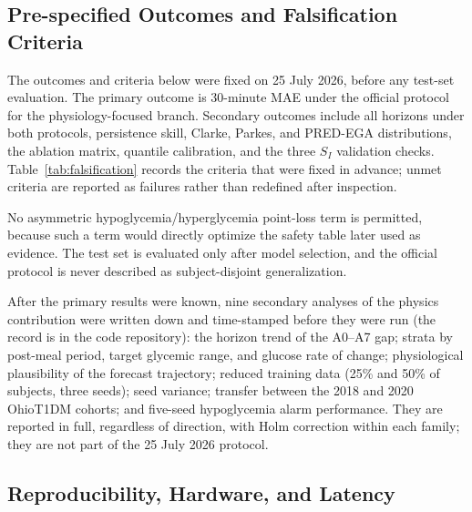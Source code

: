 \documentclass[journal]{IEEEtran}
\begin{document}
\subsection{Pre-specified Outcomes and Falsification Criteria}
\label{sec:prespec}

The outcomes and criteria below were fixed on 25 July 2026, before any test-set evaluation. The primary outcome is 30-minute MAE under the official protocol for the physiology-focused branch. Secondary outcomes include all horizons under both protocols, persistence skill, Clarke, Parkes, and PRED-EGA distributions, the ablation matrix, quantile calibration, and the three $S_I$ validation checks. Table~\ref{tab:falsification} records the criteria that were fixed in advance; unmet criteria are reported as failures rather than redefined after inspection.

No asymmetric hypoglycemia/hyperglycemia point-loss term is permitted, because such a term would directly optimize the safety table later used as evidence. The test set is evaluated only after model selection, and the official protocol is never described as subject-disjoint generalization.

After the primary results were known, nine secondary analyses of the physics contribution were written down and time-stamped before they were run (the record is in the code repository): the horizon trend of the A0--A7 gap; strata by post-meal period, target glycemic range, and glucose rate of change; physiological plausibility of the forecast trajectory; reduced training data (25\% and 50\% of subjects, three seeds); seed variance; transfer between the 2018 and 2020 OhioT1DM cohorts; and five-seed hypoglycemia alarm performance. They are reported in full, regardless of direction, with Holm correction within each family; they are not part of the 25 July 2026 protocol.

\subsection{Reproducibility, Hardware, and Latency}
\end{document}
